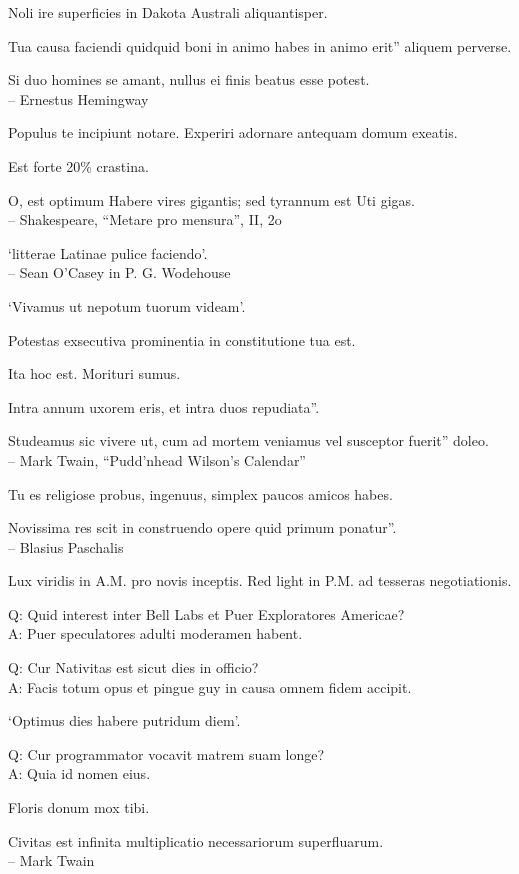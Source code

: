 \documentclass[titlepage,12pt]{memoir}
\begin{document}
Noli ire superficies in Dakota Australi aliquantisper.

Tua causa faciendi quidquid boni in animo habes in animo erit”
aliquem perverse.

Si duo homines se amant, nullus ei finis beatus esse potest.
\\-- Ernestus Hemingway

Populus te incipiunt notare. Experiri adornare antequam domum exeatis.

Est forte 20\% crastina.

O, est optimum
Habere vires gigantis; sed tyrannum est
Uti gigas.
\\-- Shakespeare, “Metare pro mensura”, II, 2o

‘litterae Latinae pulice faciendo’.
\\-- Sean O’Casey in P. G. Wodehouse

‘Vivamus ut nepotum tuorum videam’.

Potestas exsecutiva prominentia in constitutione tua est.

Ita hoc est. Morituri sumus.

Intra annum uxorem eris, et intra duos repudiata”.

Studeamus sic vivere ut, cum ad mortem veniamus vel susceptor fuerit”
doleo.
\\-- Mark Twain, “Pudd’nhead Wilson’s Calendar”

Tu es religiose probus, ingenuus, simplex
paucos amicos habes.

Novissima res scit in construendo opere quid primum ponatur”.
\\-- Blasius Paschalis

Lux viridis in A.M. pro novis inceptis. Red light in P.M. ad tesseras negotiationis.

Q: Quid interest inter Bell Labs et Puer Exploratores Americae?\\
A: Puer speculatores adulti moderamen habent.

Q: Cur Nativitas est sicut dies in officio?\\
A: Facis totum opus et pingue guy in causa
omnem fidem accipit.

‘Optimus dies habere putridum diem’.

Q: Cur programmator vocavit matrem suam longe?\\
A: Quia id nomen eius.

Floris donum mox tibi.

Civitas est infinita multiplicatio necessariorum superfluarum.
\\-- Mark Twain
\end{document}
